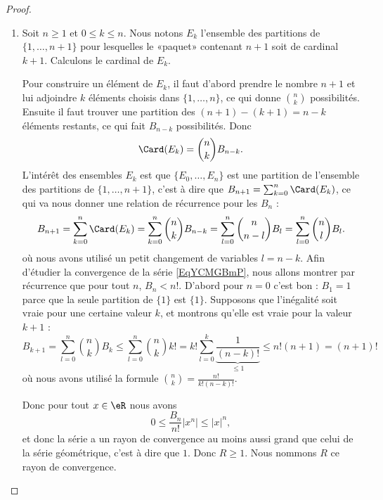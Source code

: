 \begin{proof}
    \begin{enumerate}
        \item
            Soit \( n\geq 1\) et \( 0\leq k\leq n\). Nous notons \( E_k\) l'ensemble des partitions de \( \{ 1,\ldots, n+1 \}\) pour lesquelles le «paquet» contenant \( n+1\) soit de cardinal \( k+1\). Calculons le cardinal de \( E_k\).

            Pour construire un élément de \( E_k\), il faut d'abord prendre le nombre \( n+1\) et lui adjoindre \( k\) éléments choisis dans \( \{ 1,\ldots, n \}\), ce qui donne \( n\choose k\) possibilités. Ensuite il faut trouver une partition des \( (n+1)-(k+1)=n-k\) éléments restants, ce qui fait \( B_{n-k}\) possibilités. Donc
            \begin{equation}
                \Card(E_k)={n\choose k}B_{n-k}.
            \end{equation}
            L'intérêt des ensembles \( E_k\) est que \( \{ E_0,\ldots, E_n \}\) est une partition de l'ensemble des partitions de \( \{ 1,\ldots, n+1 \}\), c'est à dire que \( B_{n+1}=\sum_{k=0}^n\Card(E_k)\), ce qui va nous donner une relation de récurrence pour les \( B_n\) :
\begin{equation}
                    B_{n+1}=\sum_{k=0}^n\Card(E_k)
                   =\sum_{k=0}^n{n\choose k}B_{n-k}
                    =\sum_{l=0}^n{n\choose n-l}B_l 
                    =\sum_{l=0}^n{n\choose l}B_l.
\end{equation}
où nous avons utilisé un petit changement de variables \( l=n-k\). Afin d'étudier la convergence de la série \eqref{EqYCMGBmP}, nous allons montrer par récurrence que pour tout \( n\), \( B_n<n!\). D'abord pour \( n=0\) c'est bon : \( B_1=1\) parce que la seule partition de \( \{ 1 \}\) est \( \{ 1 \}\). Supposons que l'inégalité soit vraie pour une certaine valeur \( k\), et montrons qu'elle est vraie pour la valeur \( k+1\) :
\begin{equation}
                    B_{k+1}=\sum_{l=0}^n{n\choose k}B_k
                   \leq \sum_{l=0}^n{n\choose k}k!
                    =k!\sum_{l=0}^k\underbrace{\frac{1}{ (n-k)! }}_{\leq 1}
                    \leq n!(n+1)
                    =(n+1)!
\end{equation}
            où nous avons utilisé la formule \( {n\choose k}=\frac{ n! }{ k!(n-k)! }\).

            Donc pour tout \( x\in \eR\) nous avons
            \begin{equation}
                0\leq \frac{ B_n }{ n! }| x^n |\leq | x |^n,
            \end{equation}
            et donc la série a un rayon de convergence au moins aussi grand que celui de la série géométrique, c'est à dire que \( 1\). Donc \( R\geq 1\). Nous nommons \( R\) ce rayon de convergence.


\end{enumerate}
\end{proof}
